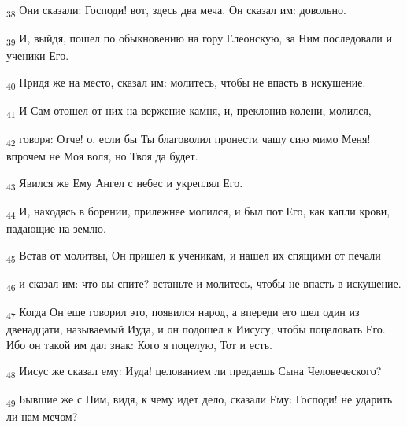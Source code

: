 \begin{tcolorbox}
\textsubscript{38} Они сказали: Господи! вот, здесь два меча. Он сказал им: довольно.
\end{tcolorbox}
\begin{tcolorbox}
\textsubscript{39} И, выйдя, пошел по обыкновению на гору Елеонскую, за Ним последовали и ученики Его.
\end{tcolorbox}
\begin{tcolorbox}
\textsubscript{40} Придя же на место, сказал им: молитесь, чтобы не впасть в искушение.
\end{tcolorbox}
\begin{tcolorbox}
\textsubscript{41} И Сам отошел от них на вержение камня, и, преклонив колени, молился,
\end{tcolorbox}
\begin{tcolorbox}
\textsubscript{42} говоря: Отче! о, если бы Ты благоволил пронести чашу сию мимо Меня! впрочем не Моя воля, но Твоя да будет.
\end{tcolorbox}
\begin{tcolorbox}
\textsubscript{43} Явился же Ему Ангел с небес и укреплял Его.
\end{tcolorbox}
\begin{tcolorbox}
\textsubscript{44} И, находясь в борении, прилежнее молился, и был пот Его, как капли крови, падающие на землю.
\end{tcolorbox}
\begin{tcolorbox}
\textsubscript{45} Встав от молитвы, Он пришел к ученикам, и нашел их спящими от печали
\end{tcolorbox}
\begin{tcolorbox}
\textsubscript{46} и сказал им: что вы спите? встаньте и молитесь, чтобы не впасть в искушение.
\end{tcolorbox}
\begin{tcolorbox}
\textsubscript{47} Когда Он еще говорил это, появился народ, а впереди его шел один из двенадцати, называемый Иуда, и он подошел к Иисусу, чтобы поцеловать Его. Ибо он такой им дал знак: Кого я поцелую, Тот и есть.
\end{tcolorbox}
\begin{tcolorbox}
\textsubscript{48} Иисус же сказал ему: Иуда! целованием ли предаешь Сына Человеческого?
\end{tcolorbox}
\begin{tcolorbox}
\textsubscript{49} Бывшие же с Ним, видя, к чему идет дело, сказали Ему: Господи! не ударить ли нам мечом?
\end{tcolorbox}
